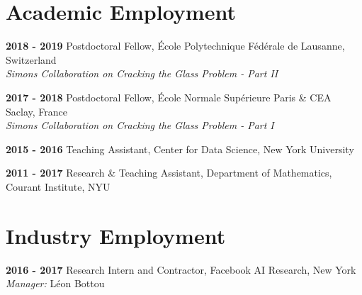 \documentclass[10pt,letterpaper]{article}
\renewenvironment{itemize}
{
\begin{list}{}{\setlength{\leftmargin}{1.5em}}
}
{
  \end{list}
}
\begin{document}
\section*{Academic Employment}
\begin{itemize}
\item \textbf{2018 - 2019 } Postdoctoral Fellow, \'Ecole Polytechnique F\'ed\'erale de Lausanne, Switzerland \\ 
\hspace*{2cm} \textit{ Simons Collaboration on Cracking the Glass Problem - Part II}

\item \textbf{2017 - 2018 } Postdoctoral Fellow, \'Ecole Normale Sup\'erieure Paris \& CEA Saclay, France \\ 
\hspace*{2cm} \textit{ Simons Collaboration on Cracking the Glass Problem - Part I}

\item \textbf{2015 - 2016 } Teaching Assistant, Center for Data Science, New York University

\item \textbf{2011 - 2017 } Research \& Teaching Assistant, Department of Mathematics, Courant Institute, NYU
\end{itemize}

\section*{Industry Employment}
\begin{itemize}
\item \textbf{2016 - 2017 } Research Intern and Contractor, Facebook AI Research, New York \\ 
\hspace*{2cm} \textit{ Manager: }{L\'eon Bottou}
\end{itemize}
\end{document}
